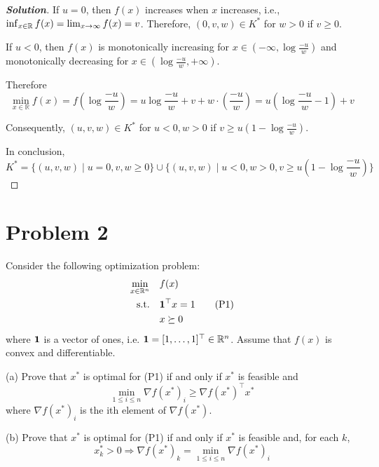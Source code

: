 \documentclass[11pt]{article}
\newenvironment{solution}
  {\renewcommand\qedsymbol{$\square$}\begin{proof}[\textbf{Solution}]}
  {\end{proof}}
\newcommand{\grad}{\nabla}
\newcommand{\T}{^\top}
\begin{document}
\begin{solution}
If $u=0$, then $f(x)$ increases when $x$ increases, i.e., $\inf_{x \in {{\mathbb{R}}}} f(x)=\lim_{x \rightarrow \infty} f(x)=v$. Therefore, $(0, v, w) \in K^*$ for $w>0$ if $v \geq 0$.

If $u<0$, then $f(x)$ is monotonically increasing for $x \in\left(-\infty, \log \frac{-u}{w}\right)$ and monotonically decreasing for $x \in\left(\log \frac{-u}{w},+\infty\right)$. 

Therefore 
$$\min_{x \in \mathbb{R}} f(x)=f\left(\log \frac{-u}{w}\right)=u \log \frac{-u}{w}+v+w \cdot\left(\frac{-u}{w}\right)=u\left(\log \frac{-u}{w}-1\right)+v$$

Consequently, $(u, v, w) \in K^*$ for $u<0, w>0$ if $v \geq u\left(1-\log \frac{-u}{w}\right)$.

In conclusion, 
\[
K^* = \{(u, v, w) \mid  u = 0, v, w \geq 0\} \cup \{(u, v, w) \mid  u<0, w>0, v\geq u(1-\log \frac{-u}{w})\}
\]

\end{solution}



\clearpage
\section*{Problem 2}
Consider the following optimization problem:
\begin{align}
    \min_{x\in\real^n}\quad &f(x)\notag\\
    \text{s.t.}\quad 
    &\ones\T x = 1\tag{P1}\\
    &x\succeq 0\notag
\end{align}
where $\mathbf 1$ is a vector of ones, i.e. $\ones = [1, \dots, 1]\T\in\real^n$. Assume that $f(x)$ is convex and differentiable.

(a) Prove that $x^*$ is optimal for (P1) if and only if $x^*$ is feasible and
\[
\min_{1\leq i \leq n} \grad f(x^*)_i \geq \grad f(x^*)\T x^*
\]
where $\grad f(x^*)_i$ is the ith element of $\grad f(x^*)$.

(b) Prove that $x^*$ is optimal for (P1) if and only if $x^*$ is feasible and, for each $k$,
\[
x_k^* > 0 \Rightarrow \grad f(x^*)_k = \min_{1\leq i\leq n}\grad f(x^*)_i
\]
\end{document}
